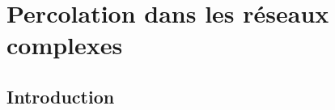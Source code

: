 
\chapter{Percolation dans les réseaux complexes}
\begin{minipage}{\textwidth}
	\linespread{1.2}
	\minitoc
\end{minipage}

\newcommand{\kma}{\textless k_a \textgreater}
\newcommand{\kmap}{\textless k'_a \textgreater}
\newcommand{\kmaa}{\textless k_a^2 \textgreater}

\section{Introduction}

